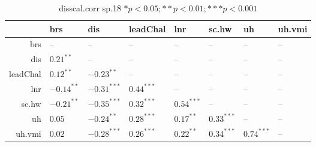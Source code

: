 \begin{table}[ht]
\centering
\begin{tabular}{rlllllll}
  \hline
 & brs & dis & leadChal & lnr & sc.hw & uh & uh.vmi \\ 
  \hline
brs & -- & -- & -- & -- & -- & -- & -- \\ 
  dis & $0.21^{**}$ & -- & -- & -- & -- & -- & -- \\ 
  leadChal & $0.12^{**}$ & $-0.23^{**}$ & -- & -- & -- & -- & -- \\ 
  lnr & $-0.14^{**}$ & $-0.31^{***}$ & $0.44^{***}$ & -- & -- & -- & -- \\ 
  sc.hw & $-0.21^{**}$ & $-0.35^{***}$ & $0.32^{***}$ & $0.54^{***}$ & -- & -- & -- \\ 
  uh & $0.05$ & $-0.24^{**}$ & $0.28^{***}$ & $0.17^{**}$ & $0.33^{***}$ & -- & -- \\ 
  uh.vmi & $0.02$ & $-0.28^{***}$ & $0.26^{***}$ & $0.22^{**}$ & $0.34^{***}$ & $0.74^{***}$ & -- \\ 
   \hline
\end{tabular}
\caption{disscal.corr sp.18 $* p < 0.05; ** p < 0.01; *** p < 0.001$} 
\label{freq_corr.disscal.corr.sp.18}
\end{table}
